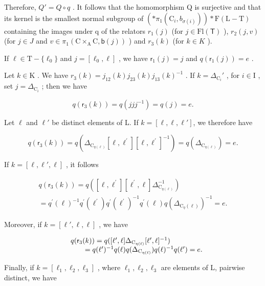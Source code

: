 Therefore, \(Q' = Q \circ q\) . It follows that the homomorphism Q is surjective and that its kernel is the smallest normal subgroup of \(\left(\ast\pi_{1}(\mathrm{C}_{i}, b_{\sigma(i)})\right)\ast\mathrm{F}(\mathrm{L}-\mathrm{T})\) containing the images under q of the relators \(r_{1}(j)\) (for \(j \in \mathrm{Fl}(\mathsf{T})\) ), \(r_{2}(j, v)\) (for \(j \in J\) and \(v \in \pi_{1}(\mathrm{C} \times_{\mathrm{A}} \mathrm{C}, \mathsf{b}(j))\) ) and \(r_{3}(k)\) (for \(k \in K\) ).

If \(\ell\in\mathrm{T}-\{\ell_{0}\}\) and \(j=[\ell_{0},\ell]\) , we have \(\mathsf{r}_{1}(j)=j\) and \(q(\mathsf{r}_{1}(j))=e\) .

Let \(k \in \mathrm{K}\) . We have \(r_3(k) = j_{12}(k)j_{23}(k)j_{13}(k)^{-1}\) . If \(k = \Delta_{\mathrm{C}_i}'\) , for \(i \in \mathrm{I}\) , set \(j = \Delta_{\mathrm{C}_i}\) ; then we have

\[
q (\mathsf {r} _ {3} (k)) = q (j j j ^ {- 1}) = q (j) = e.
\]

Let \(\ell\) and \(\ell'\) be distinct elements of L. If \(k = [\ell, \ell, \ell']\), we therefore have

\[
q (\mathsf {r} _ {3} (k)) = q \left(\Delta_ {\mathrm{C} _ {\eta (\ell)}} [ \ell , \ell^ {\prime} ] [ \ell , \ell^ {\prime} ] ^ {- 1}\right) = q \left(\Delta_ {\mathrm{C} _ {\eta (\ell)}}\right) = e.
\]

If \(k = [\ell, \ell', \ell]\) , it follows

\[
\begin{array}{c} q (\mathsf {r} _ {3} (k)) = q ([ \ell , \ell^ {\prime} ] [ \ell^ {\prime}, \ell ] \Delta_ {\mathrm{C} _ {\eta (\ell)}} ^ {- 1}) \\ = q ^ {\prime} (\ell) ^ {- 1} q ^ {\prime} (\ell^ {\prime}) q ^ {\prime} (\ell^ {\prime}) ^ {- 1} q ^ {\prime} (\ell) q (\Delta_ {\mathrm{C} _ {\eta} (\ell)}) ^ {- 1} = e. \end{array}
\]

Moreover, if \(k = [\ell', \ell, \ell]\) , we have

\[
\begin{array}{r l} & q (\mathsf {r} _ {3} (k)) = q ([ \ell^ {\prime}, \ell ] \Delta_ {\mathrm{C} _ {\eta (\ell)}} [ \ell^ {\prime}, \ell ] ^ {- 1}) \\ & \qquad = q (\ell^ {\prime}) ^ {- 1} q (\ell) q (\Delta_ {\mathrm{C} _ {\eta (\ell)}}) q (\ell) ^ {- 1} q (\ell^ {\prime}) = e. \end{array}
\]

Finally, if \(k = [\ell_{1}, \ell_{2}, \ell_{3}]\) , where \(\ell_{1}, \ell_{2}, \ell_{3}\) are elements of L, pairwise distinct, we have

